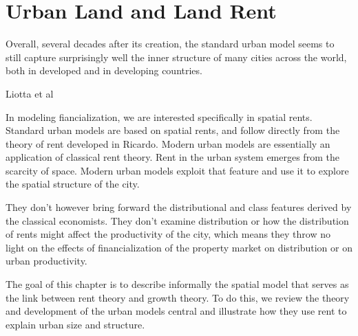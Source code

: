 \chapter{Urban Land and Land Rent} \label{chapter-space}

\epigraph{Overall, several decades after its creation, the standard urban model seems to still capture surprisingly well the inner structure of many cities across the world, both in developed and in developing countries.}{Liotta et al \cite{liottaTestingMonocentricStandard2022}}



In  modeling fiancialization, we are interested specifically in spatial rents. Standard urban models are based on spatial rents, and follow directly from the theory of rent developed in Ricardo.
Modern urban models are essentially an application of classical rent theory. Rent in the urban system emerges from the %
scarcity of space. Modern urban models exploit that feature and use it to explore the spatial structure of the city.

They don't however bring forward the distributional and class features derived by the classical economists.  They don't examine distribution or how the distribution of rents might affect the productivity of the city, which means they throw no light on the effects of financialization of the property market on distribution or on urban productivity.

The goal of this chapter is to describe informally the spatial model that serves as the link between rent theory and growth theory. %
To do this, we review the theory and development of the urban models central and illustrate how they %
use rent to explain urban size and structure. 








